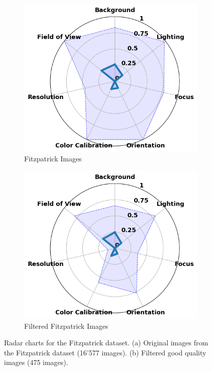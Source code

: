 \clearpage
\begin{figure}[ht]
    \centering
    \begin{subfigure}[b]{0.48\textwidth}
        \includegraphics[width=\textwidth]{img/hept/Fitzpatrick17k.png}
        \caption{Fitzpatrick Images}
        \label{fig:Fitzpatrick17K}
    \end{subfigure}
    \hfill
    \begin{subfigure}[b]{0.48\textwidth}
        \includegraphics[width=\textwidth]{img/hept/F17K.png}
        \caption{Filtered Fitzpatrick Images}
        \label{fig:F17K}
    \end{subfigure}
    \hfill
    \caption{Radar charts for the Fitzpatrick dataset. (a) Original images from the Fitzpatrick dataset (16'577 images). (b) Filtered good quality images (475 images).}
    \label{fig:FF}
\end{figure}

